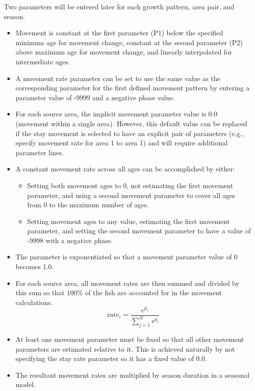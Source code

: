 Two parameters will be entered later for each growth pattern, area pair, and season.
\begin{itemize}
	\item Movement is constant at the first parameter (P1) below the specified minimum age for movement change, constant at the second parameter (P2) above maximum age for movement change, and linearly interpolated for intermediate ages.
	\item A movement rate parameter can be set to use the same value as the corresponding parameter for the first defined movement pattern by entering a parameter value of -9999 and a negative phase value.
	\item For each source area, the implicit movement parameter value is 0.0 (movement within a single area). However, this default value can be replaced if the stay movement is selected to have an explicit pair of parameters (e.g., specify movement rate for area 1 to area 1) and will require additional parameter lines.
	\item A constant movement rate across all ages can be accomplished by either:
	\begin{itemize}
		\item Setting both movement ages to 0, not estimating the first movement parameter, and using a second movement parameter to cover all ages from 0 to the maximum number of ages.
		\item Setting movement ages to any value, estimating the first movement parameter, and setting the second movement parameter to have a value of -9998 with a negative phase.
	\end{itemize} 
	\item The parameter is exponentiated so that a movement parameter value of 0 becomes 1.0.
	\item For each source area, all movement rates are then summed and divided by this sum so that 100\% of the fish are accounted for in the movement calculations.
	\begin{equation}
	\text{rate}_i = \frac{e^{p_i}}{\sum_{j=1}^{N}e^{p_i}}
	\end{equation}
	\item At least one movement parameter must be fixed so that all other movement parameters are estimated relative to it. This is achieved naturally by not specifying the stay rate parameter so it has a fixed value of 0.0.
	\item The resultant movement rates are multiplied by season duration in a seasonal model.	
\end{itemize}


